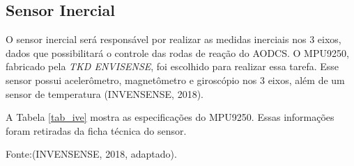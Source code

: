 
\subsection{Sensor Inercial}

O sensor inercial será responsável por realizar as medidas inerciais nos 3 eixos, dados que possibilitará o controle das rodas de reação do AODCS. O MPU9250, fabricado pela \textit{TKD ENVISENSE}, foi escolhido para realizar essa tarefa. Esse sensor possui acelerômetro, magnetômetro e giroscópio nos 3 eixos, além de um sensor de temperatura (INVENSENSE, 2018).

A Tabela \ref{tab_ive} mostra as especificações do MPU9250. Essas informações foram retiradas da ficha técnica do sensor.

\begin{table}[h]
	\centering
	\caption{Informações técnicas sobre sensor MPU9250.}
	\label{tab_ive}
	\centering
\footnotesize{Fonte:(INVENSENSE, 2018, adaptado).}
\end{table}

